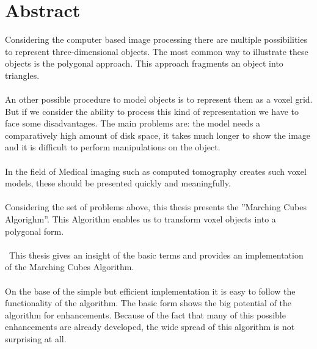 \chapter*{Abstract}
Considering the computer based image processing there are multiple possibilities to represent three-dimensional objects. The most common way to illustrate these objects is the polygonal approach. This approach fragments an object into triangles.
\\\\
An other possible procedure to model objects is to represent them as a voxel grid. But if we consider the ability to process this kind of representation we have to face some disadvantages. The main problems are: the model needs a comparatively high amount of disk space, it takes much longer to show the image and it is difficult to perform manipulations on the object.
\\\\
In the field of Medical imaging such as computed tomography creates such voxel models, these should be presented quickly and meaningfully.
\\\\
Considering the set of problems above, this thesis presents the ''Marching Cubes Algorighm''. This Algorithm enables us to transform voxel objects into a polygonal form. 
\\\\\
This thesis gives an insight of the basic terms and provides an implementation of the Marching Cubes Algorithm.
\\\\
On the base of the simple but efficient implementation it is easy to follow the functionality of the algorithm. The basic form shows the big potential of the algorithm for enhancements. Because of the fact that many of this possible enhancements are already developed, the wide spread of this algorithm is not surprising at all.